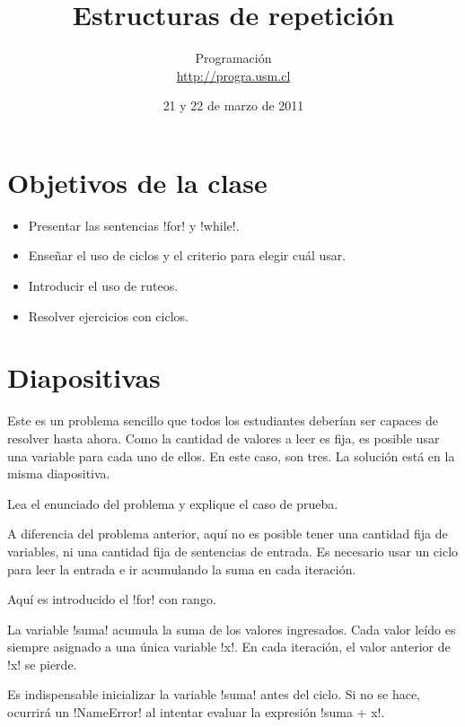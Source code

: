 \documentclass[10pt]{article}
\title{Estructuras de repetición}
\author{Programación \\ \url{http://progra.usm.cl}}
\date{21 y 22 de marzo de 2011}
\begin{document}
  \maketitle

  \section*{Objetivos de la clase}
  \begin{itemize}
    \item Presentar las sentencias \li!for! y \li!while!.
    \item Enseñar el uso de ciclos y el criterio para elegir cuál usar.
    \item Introducir el uso de ruteos.
    \item Resolver ejercicios con ciclos.
  \end{itemize}

  \section*{Diapositivas}


  Este es un problema sencillo que todos los estudiantes
  deberían ser capaces de resolver hasta ahora.
  Como la cantidad de valores a leer es fija,
  es posible usar una variable para cada uno de ellos.
  En este caso, son tres.
  La solución está en la misma diapositiva.


  Lea el enunciado del problema y explique el caso de prueba.

  A diferencia del problema anterior,
  aquí no es posible tener una cantidad fija de variables,
  ni una cantidad fija de sentencias de entrada.
  Es necesario usar un ciclo
  para leer la entrada
  e ir acumulando la suma en cada iteración.


  Aquí es introducido el \li!for! con rango.

  La variable \li!suma! acumula la suma de los valores ingresados.
  Cada valor leído es siempre asignado a una única variable \li!x!.
  En cada iteración, el valor anterior de \li!x! se pierde.

  Es indispensable inicializar la variable \li!suma! antes del ciclo.
  Si no se hace, ocurrirá un \li!NameError!
  al intentar evaluar la expresión \li!suma + x!.
\end{document}

